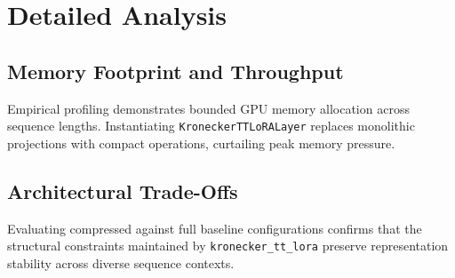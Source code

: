 \section{Detailed Analysis}

\subsection{Memory Footprint and Throughput}
Empirical profiling demonstrates bounded GPU memory allocation across sequence lengths. Instantiating \texttt{KroneckerTTLoRALayer} replaces monolithic projections with compact operations, curtailing peak memory pressure.

\subsection{Architectural Trade-Offs}
Evaluating compressed against full baseline configurations confirms that the structural constraints maintained by \texttt{kronecker_tt_lora} preserve representation stability across diverse sequence contexts.

